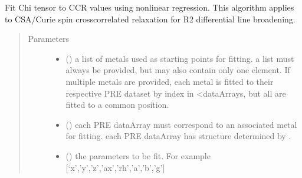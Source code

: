 \documentclass[a4paper,10pt,english,openany,oneside]{sphinxmanual}
\begin{document}
\begin{fulllineitems}
\label{\detokenize{reference/generated/paramagpy.fit.nlr_fit_metal_from_ccr:paramagpy.fit.nlr_fit_metal_from_ccr}}
\sphinxAtStartPar
Fit Chi tensor to CCR values using non\sphinxhyphen{}linear regression.
This algorithm applies to CSA/Curie spin cross\sphinxhyphen{}correlated relaxation
for R2 differential line broadening.
\begin{quote}\begin{description}
\item[{Parameters}] \leavevmode\begin{itemize}
\item {} 
\sphinxAtStartPar
{} () \textendash{} a list of metals used as starting points for fitting.
a list must always be provided, but may also contain
only one element. If multiple metals are provided, each metal
is fitted to their respective PRE dataset by index in \textless{}dataArrays,
but all are fitted to a common position.

\item {} 
\sphinxAtStartPar
{} () \textendash{} each PRE dataArray must correspond to an associated metal for fitting.
each PRE dataArray has structure determined by
{\hyperref[\detokenize{reference/generated/paramagpy.protein.CustomStructure.parse:paramagpy.protein.CustomStructure.parse}]{}}.

\item {} 
\sphinxAtStartPar
{} () \textendash{} the parameters to be fit.
For example {[}‘x’,’y’,’z’,’ax’,’rh’,’a’,’b’,’g’{]}


\end{itemize}
\end{description}
\end{quote}
\end{fulllineitems}
\end{document}
